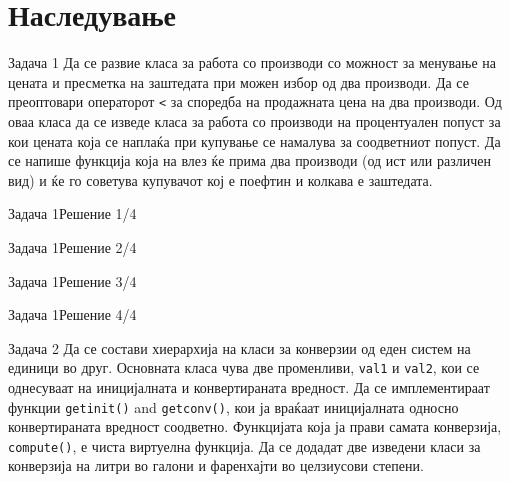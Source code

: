 
\section{Наследување}

\begin{frame}{Задача 1}{}
 Да се развие класа за работа со производи со можност за менување на цената и
 пресметка на заштедата при можен избор од два производи. Да се преоптовари
 операторот \texttt{<} за споредба на  продажната цена на два производи. Од оваа класа да
 се изведе класа за работа со производи на процентуален попуст за кои цената
 која се наплаќа при купување се намалува за соодветниот попуст. Да се напише
 функција која на влез ќе прима два производи (од ист или различен вид) и ќе го
 советува купувачот кој е поефтин и колкава е заштедата.
\end{frame}

\begin{frame}[fragile]{Задача 1}{Решение 1/4}

\end{frame}

\begin{frame}[fragile]{Задача 1}{Решение 2/4}

\end{frame}

\begin{frame}[fragile]{Задача 1}{Решение 3/4}

\end{frame}

\begin{frame}[fragile]{Задача 1}{Решение 4/4}

\end{frame}

\begin{frame}{Задача 2}
    Да  се  состави хиерархија на  класи  за  конверзии од  еден  систем на 
    единици  во  друг. Основната класа чува две променливи, \texttt{val1} и \texttt{val2}, кои се
    однесуваат на иницијалната и конвертираната вредност. Да се имплементираат
    функции \texttt{getinit()} and \texttt{getconv()}, кои ја враќаат  иницијалната  односно 
    конвертираната  вредност  соодветно. Функцијата која ја прави самата
    конверзија, \texttt{compute()}, е чиста виртуелна функција. Да се  додадат две
    изведени класи за конверзија на литри во галони и фаренхајти во целзиусови
    степени.
\end{frame}


